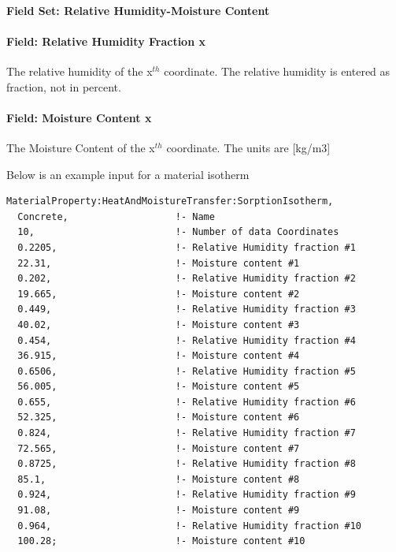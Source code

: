 \paragraph{Field Set: Relative Humidity-Moisture Content}\label{field-set-relative-humidity-moisture-content}

\paragraph{Field: Relative Humidity Fraction x}\label{field-relative-humidity-fraction-x}

The relative humidity of the x\(^{th}\) coordinate. The relative humidity is entered as fraction, not in percent.

\paragraph{Field: Moisture Content x}\label{field-moisture-content-x}

The Moisture Content of the x\(^{th}\) coordinate. The units are {[}kg/m3{]}

Below is an example input for a material isotherm

\begin{lstlisting}
MaterialProperty:HeatAndMoistureTransfer:SorptionIsotherm,
  Concrete,                   !- Name
  10,                         !- Number of data Coordinates
  0.2205,                     !- Relative Humidity fraction #1
  22.31,                      !- Moisture content #1
  0.202,                      !- Relative Humidity fraction #2
  19.665,                     !- Moisture content #2
  0.449,                      !- Relative Humidity fraction #3
  40.02,                      !- Moisture content #3
  0.454,                      !- Relative Humidity fraction #4
  36.915,                     !- Moisture content #4
  0.6506,                     !- Relative Humidity fraction #5
  56.005,                     !- Moisture content #5
  0.655,                      !- Relative Humidity fraction #6
  52.325,                     !- Moisture content #6
  0.824,                      !- Relative Humidity fraction #7
  72.565,                     !- Moisture content #7
  0.8725,                     !- Relative Humidity fraction #8
  85.1,                       !- Moisture content #8
  0.924,                      !- Relative Humidity fraction #9
  91.08,                      !- Moisture content #9
  0.964,                      !- Relative Humidity fraction #10
  100.28;                     !- Moisture content #10
\end{lstlisting}


